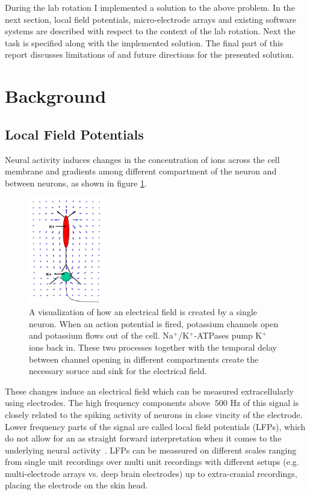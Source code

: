 \documentclass[11pt, twocolumn]{article}
\begin{document}
        During the lab rotation I implemented a solution to the above problem.
        In the next section, local field potentials, micro-electrode arrays and existing software systems are described with respect to the context of the lab rotation.
        Next the task is specified along with the implemented solution. The final part of this report discusses limitations of and future directions for the presented solution.
\section{Background}
    \subsection{Local Field Potentials}
        Neural activity induces changes in the concentration of ions across the cell membrane and gradients among different compartment of the neuron and between neurons, as shown in figure \ref{field}.
        \begin{figure}
        \begin{center}
         \includegraphics[keepaspectratio, width=0.3\textwidth]{img/2_lfp.png}
        \end{center}
         \caption{A visualization of how an electrical field is created by a single neuron. When an action potential is fired, potassium channels open and potassium flows out of the cell. Na$^+$/K$^+$-ATPases pump K$^+$ ions back in. These two processes together with the temporal delay between channel opening in different compartments create the necessary soruce and sink for the electrical field.}\label{field}
        \end{figure}

        These changes induce an electrical field which can be measured extracellularly using electrodes.
        The high frequency components above $~500$ Hz of this signal is closely related to the spiking activity of neurons in close vincity of the electrode.
        Lower frequency parts of the signal are  called local field potentials (LFPs), which do not allow for an as straight forward interpretation when it comes to the underlying neural activity~\autocite{einevoll2013modelling, herreras2016local}.
        LFPs can be meassured on different scales ranging from single unit recordings over multi unit recordings with different setups (e.g. multi-electrode arrays vs. deep brain electrodes) up to extra-cranial recordings, placing the electrode on the skin head. \\
\end{document}
